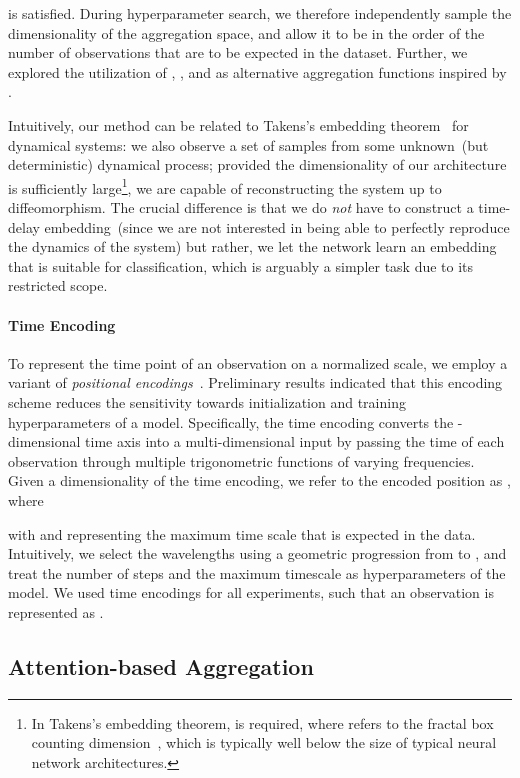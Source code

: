 \documentclass{article}
\begin{document}
is satisfied.  
During hyperparameter search, we therefore independently sample the
dimensionality of the aggregation space, and allow it to be in the order
of the number of observations that are to be expected in the dataset.
Further, we explored the utilization of , , and
 as alternative aggregation functions inspired by
\citet{zaheer2017deep,garnelo2018conditional}.

Intuitively, our method can be related to
Takens's embedding theorem~\citep{Takens81} for dynamical systems:
we also observe a set of samples from some unknown~(but deterministic)
dynamical process; provided the dimensionality of our architecture is
sufficiently large\footnote{In Takens's embedding theorem,  is required, where 
  refers to the fractal box counting dimension~\citep{Liebovitch89},
  which is typically well below the size of typical neural network
  architectures.
}, we are capable of reconstructing the system up to diffeomorphism.
The crucial difference is that we do \emph{not} have to construct
a time-delay embedding~(since we are not interested in being able to
perfectly reproduce the dynamics of the system) but rather, we let the
network learn an embedding that is suitable for classification, which is
arguably a simpler task due to its restricted scope.

\paragraph{Time Encoding}
To represent the time point of an observation on a normalized scale,
we employ a variant of \emph{positional encodings}~\citep{vaswani2017attention}.
Preliminary results indicated that this encoding scheme reduces the
sensitivity towards initialization and training hyperparameters of
a model.
Specifically, the time encoding converts the \mbox{-dimensional} time
axis into a multi-dimensional input by passing the time  of each
observation through multiple trigonometric functions of varying
frequencies.
Given a dimensionality  of the time encoding, we
refer to the encoded position as , where

with  and 
representing the maximum time scale that is expected in the
data.
Intuitively, we select the wavelengths using a geometric
progression from  to , and treat the
number of steps and the maximum timescale  as
hyperparameters of the model.  We used time encodings for all
experiments, such that an observation is represented as .

\subsection{Attention-based Aggregation}\label{sec:attention}
\end{document}
